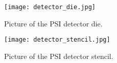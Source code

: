 \begin{figure}[H]
    \centering
    \texttt{[image: detector\_die.jpg]}
    \caption[PSI Detector Die]{Picture of the PSI detector die.}
    \label{fig:detector_die}
\end{figure}

\begin{figure}[H]
    \centering
    \texttt{[image: detector\_stencil.jpg]}
    \caption[PSI Detector Stencil]{Picture of the PSI detector stencil.}
    \label{fig:detector_stencil}
\end{figure}
